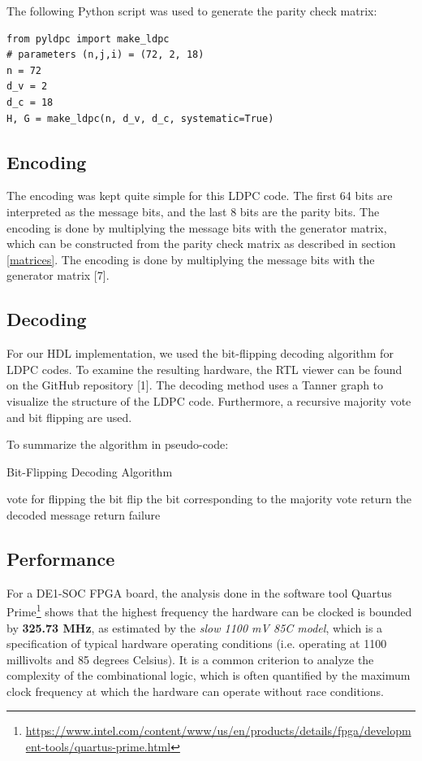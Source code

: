 \documentclass[conference]{IEEEtran}
\begin{document}
The following Python script was used to generate the parity check matrix:
\begin{verbatim}
from pyldpc import make_ldpc
# parameters (n,j,i) = (72, 2, 18)
n = 72
d_v = 2
d_c = 18
H, G = make_ldpc(n, d_v, d_c, systematic=True)
\end{verbatim}

\subsection{Encoding}
The encoding was kept quite simple for this LDPC code.
The first 64 bits are interpreted as the message bits, and the last 8 bits are the parity bits.
The encoding is done by multiplying the message bits with the generator matrix, which can be constructed from the parity check matrix as described in section \ref{matrices}.
The encoding is done by multiplying the message bits with the generator matrix [7].
\subsection{Decoding}
For our HDL implementation, we used the bit-flipping decoding algorithm for LDPC codes.
To examine the resulting hardware, the RTL viewer can be found on the GitHub repository [1]. %
The decoding method uses a Tanner graph to visualize the structure of the LDPC code.
Furthermore, a recursive majority vote and bit flipping are used.

To summarize the algorithm in pseudo-code:
\begin{algorithm}
  \caption{Bit-Flipping Decoding Algorithm}
  \begin{algorithmic}
          \STATE vote for flipping the bit
        \ELSE
        \ENDIF
      \ENDFOR
      \STATE flip the bit corresponding to the majority vote
    \ENDWHILE
    \STATE return the decoded message
    \ELSE
    \STATE return failure
    \ENDIF
  \end{algorithmic}
\end{algorithm}

\subsection{Performance}
For a DE1-SOC FPGA board, the analysis done in the software tool Quartus Prime\footnote{\url{https://www.intel.com/content/www/us/en/products/details/fpga/development-tools/quartus-prime.html}} shows that the highest frequency the hardware can be clocked is bounded by \textbf{325.73 MHz}, as estimated by the \textit{slow 1100 mV 85C model}, which is a specification of typical hardware operating conditions (i.e. operating at 1100 millivolts and 85 degrees Celsius).
It is a common criterion to analyze the complexity of the combinational logic, which is often quantified by the maximum clock frequency at which the hardware can operate without race conditions.
\end{document}
